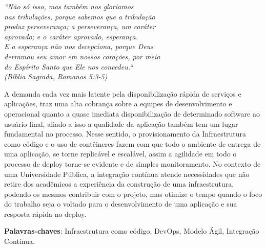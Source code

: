 \begin{epigrafe}
    \vspace*{\fill}
	\begin{flushright}
		\textit{``Não só isso, mas também nos gloriamos \\
			nas tribulações, porque sabemos que a tribulação\\
			produz perseverança; a perseverança, um caráter \\
			aprovado; e o caráter aprovado, esperança. \\
			E a esperança não nos decepciona, porque Deus \\
			derramou seu amor em nossos corações, por meio \\
			do Espírito Santo que Ele nos concedeu.``\\
			(Bíblia Sagrada, Romanos 5:3-5)}
			
	\end{flushright}
\end{epigrafe}


\setlength{\absparsep}{18pt} %
\begin{resumo}
A demanda cada vez mais latente pela disponibilização rápida de serviços e aplicações, traz uma alta cobrança sobre a equipes de desenvolvimento e operacional quanto a quase imediata disponibilização de determinado software ao usuário final, aliado a isso a qualidade da aplicação também tem um lugar fundamental no processo. Nesse sentido, o provisionamento da Infraestrutura como código e o uso de contêineres fazem com que todo o ambiente de entrega de uma aplicação, se torne replicável e escalável, assim a agilidade em todo o processo de deploy torne-se evidente e de simples monitoramento. No contexto de uma Universidade Pública, a integração contínua atende necessidades que não retire dos acadêmicos a experiência da construção de uma infraestrutura, podendo os mesmos contribuir com o projeto, mas otimize o tempo quando o foco do trabalho seja o voltado para o desenvolvimento de uma aplicação e sua resposta rápida no deploy.
 

 \textbf{Palavras-chaves}: Infraestrutura como código, DevOps, Modelo Ágil, Integração Contínua.
 
\end{resumo}




